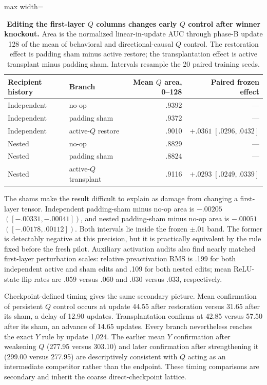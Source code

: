 \documentclass[11pt,a4paper]{article}
\begin{document}
\begin{table}[!htbp]
\centering
\small
\begin{adjustbox}{max width=\linewidth}
\begin{tabular}{llrr}
\toprule
Recipient history & Branch & Mean $Q$ area, 0--128 & Paired frozen effect \\
\midrule
Independent & no-op & .9392 & --- \\
Independent & padding sham & .9372 & --- \\
Independent & active-$Q$ restore & .9010 & $+.0361\;[.0296,.0432]$ \\
\addlinespace
Nested & no-op & .8829 & --- \\
Nested & padding sham & .8824 & --- \\
Nested & active-$Q$ transplant & .9116 & $+.0293\;[.0249,.0339]$ \\
\bottomrule
\end{tabular}
\end{adjustbox}
\caption{\textbf{Editing the first-layer $Q$ columns changes early $Q$ control after winner knockout.} Area is the normalized linear-in-update AUC through phase-B update 128 of the mean of behavioral and directional-causal $Q$ control. The restoration effect is padding sham minus active restore; the transplantation effect is active transplant minus padding sham. Intervals resample the 20 paired training seeds.}
\label{tab:q-input-pathway}
\end{table}

The shams make the result difficult to explain as damage from changing a first-layer tensor. Independent padding-sham minus no-op area is $-.00205$ $([-.00331,-.00041])$, and nested padding-sham minus no-op area is $-.00051$ $([-.00178,.00112])$. Both intervals lie inside the frozen $\pm.01$ band. The former is detectably negative at this precision, but it is practically equivalent by the rule fixed before the fresh pilot. Auxiliary activation audits also find nearly matched first-layer perturbation scales: relative preactivation RMS is .199 for both independent active and sham edits and .109 for both nested edits; mean ReLU-state flip rates are .059 versus .060 and .030 versus .033, respectively.

Checkpoint-defined timing gives the same secondary picture. Mean confirmation of persistent $Q$ control occurs at update 44.55 after restoration versus 31.65 after its sham, a delay of 12.90 updates. Transplantation confirms at 42.85 versus 57.50 after its sham, an advance of 14.65 updates. Every branch nevertheless reaches the exact $Y$ rule by update 1,024. The earlier mean $Y$ confirmation after weakening $Q$ (277.95 versus 303.10) and later confirmation after strengthening it (299.00 versus 277.95) are descriptively consistent with $Q$ acting as an intermediate competitor rather than the endpoint. These timing comparisons are secondary and inherit the coarse direct-checkpoint lattice.
\end{document}
